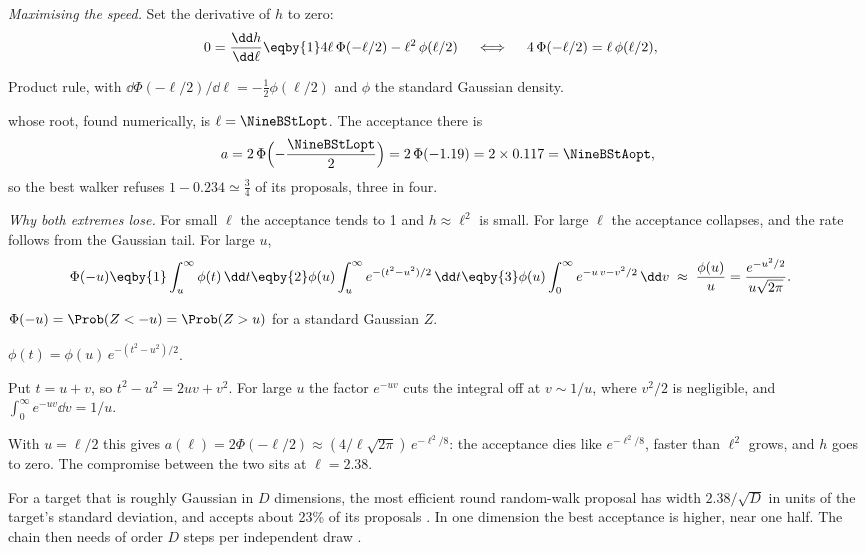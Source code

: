 \emph{Maximising the speed.} Set the derivative of $h$ to zero:
\begin{align*}
  0=\frac{\dd h}{\dd\ell}
  &\eqby{1}4\ell\,\Phi(-\ell/2)-\ell^2\,\phi(\ell/2)
  \quad\iff\quad
  4\,\Phi(-\ell/2)=\ell\,\phi(\ell/2),
\end{align*}
\begin{explain}
  \item Product rule, with $\dd\Phi(-\ell/2)/\dd\ell=-\tfrac12\phi(\ell/2)$ and $\phi$ the
        standard Gaussian density.
\end{explain}
whose root, found numerically, is $\ell=\NineBStLopt$. The acceptance there is
\begin{equation*}
  a=2\,\Phi\Bigl(-\frac{\NineBStLopt}{2}\Bigr)=2\,\Phi(-1.19)=2\times0.117=\NineBStAopt ,
\end{equation*}
so the best walker refuses $1-0.234\simeq\tfrac34$ of its proposals, three in four.

\emph{Why both extremes lose.} For small $\ell$ the acceptance tends to 1 and $h\approx\ell^2$
is small. For large $\ell$ the acceptance collapses, and the rate follows from the Gaussian tail.
For large $u$,
\begin{align*}
  \Phi(-u)
  &\eqby{1}\int_u^\infty\phi(t)\,\dd t
   \eqby{2}\phi(u)\int_u^\infty e^{-(t^2-u^2)/2}\,\dd t
   \eqby{3}\phi(u)\int_0^\infty e^{-u\,v-v^2/2}\,\dd v
   \;\approx\;\frac{\phi(u)}{u}=\frac{e^{-u^2/2}}{u\sqrt{2\pi}} .
\end{align*}
\begin{explain}
  \item $\Phi(-u)=\Prob(Z<-u)=\Prob(Z>u)$ for a standard Gaussian $Z$.
  \item $\phi(t)=\phi(u)\,e^{-(t^2-u^2)/2}$.
  \item Put $t=u+v$, so $t^2-u^2=2uv+v^2$. For large $u$ the factor $e^{-uv}$ cuts the integral
        off at $v\sim1/u$, where $v^2/2$ is negligible, and $\int_0^\infty e^{-uv}\dd v=1/u$.
\end{explain}
With $u=\ell/2$ this gives $a(\ell)=2\Phi(-\ell/2)\approx(4/\ell\sqrt{2\pi})\,e^{-\ell^2/8}$: the
acceptance dies like $e^{-\ell^2/8}$, faster than $\ell^2$ grows, and $h$ goes to zero. The
compromise between the two sits at $\ell=2.38$.

\begin{keyidea}
For a target that is roughly Gaussian in $D$ dimensions, the most efficient round random-walk
proposal has width $2.38/\sqrt D$ in units of the target's standard deviation, and accepts about
23\% of its proposals \parencite{RobertsGelmanGilks1997}. In one dimension the best acceptance is
higher, near one half. The chain then needs of order $D$ steps per independent draw
.
\end{keyidea}

